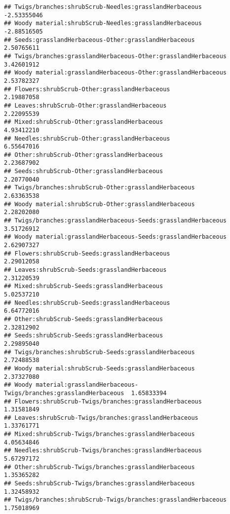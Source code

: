 \documentclass[
]{article}
\begin{document}
\begin{verbatim}
## Twigs/branches:shrubScrub-Needles:grasslandHerbaceous                 -2.53355046
## Woody material:shrubScrub-Needles:grasslandHerbaceous                 -2.88516505
## Seeds:grasslandHerbaceous-Other:grasslandHerbaceous                    2.50765611
## Twigs/branches:grasslandHerbaceous-Other:grasslandHerbaceous           3.42601912
## Woody material:grasslandHerbaceous-Other:grasslandHerbaceous           2.53782327
## Flowers:shrubScrub-Other:grasslandHerbaceous                           2.19887058
## Leaves:shrubScrub-Other:grasslandHerbaceous                            2.22095539
## Mixed:shrubScrub-Other:grasslandHerbaceous                             4.93412210
## Needles:shrubScrub-Other:grasslandHerbaceous                           6.55647016
## Other:shrubScrub-Other:grasslandHerbaceous                             2.23687902
## Seeds:shrubScrub-Other:grasslandHerbaceous                             2.20770040
## Twigs/branches:shrubScrub-Other:grasslandHerbaceous                    2.63363538
## Woody material:shrubScrub-Other:grasslandHerbaceous                    2.28202080
## Twigs/branches:grasslandHerbaceous-Seeds:grasslandHerbaceous           3.51726912
## Woody material:grasslandHerbaceous-Seeds:grasslandHerbaceous           2.62907327
## Flowers:shrubScrub-Seeds:grasslandHerbaceous                           2.29012058
## Leaves:shrubScrub-Seeds:grasslandHerbaceous                            2.31220539
## Mixed:shrubScrub-Seeds:grasslandHerbaceous                             5.02537210
## Needles:shrubScrub-Seeds:grasslandHerbaceous                           6.64772016
## Other:shrubScrub-Seeds:grasslandHerbaceous                             2.32812902
## Seeds:shrubScrub-Seeds:grasslandHerbaceous                             2.29895040
## Twigs/branches:shrubScrub-Seeds:grasslandHerbaceous                    2.72488538
## Woody material:shrubScrub-Seeds:grasslandHerbaceous                    2.37327080
## Woody material:grasslandHerbaceous-Twigs/branches:grasslandHerbaceous  1.65833394
## Flowers:shrubScrub-Twigs/branches:grasslandHerbaceous                  1.31581849
## Leaves:shrubScrub-Twigs/branches:grasslandHerbaceous                   1.33761771
## Mixed:shrubScrub-Twigs/branches:grasslandHerbaceous                    4.05634846
## Needles:shrubScrub-Twigs/branches:grasslandHerbaceous                  5.67297172
## Other:shrubScrub-Twigs/branches:grasslandHerbaceous                    1.35365282
## Seeds:shrubScrub-Twigs/branches:grasslandHerbaceous                    1.32458932
## Twigs/branches:shrubScrub-Twigs/branches:grasslandHerbaceous           1.75018969

\end{verbatim}
\end{document}

